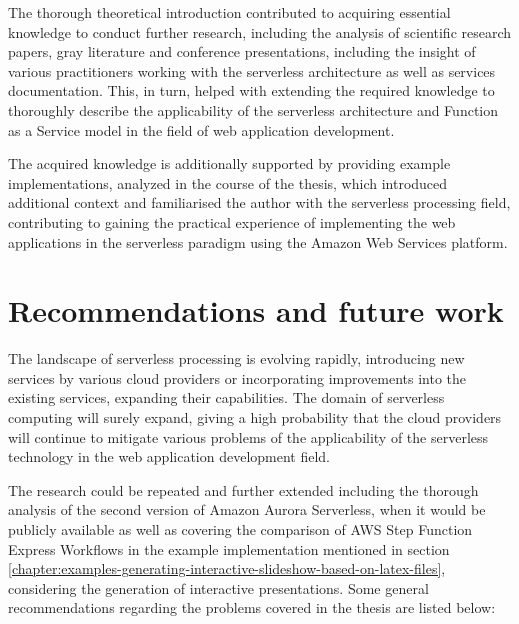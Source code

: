 The thorough theoretical introduction contributed to acquiring essential knowledge to conduct further research, including the analysis of scientific research papers, gray literature and conference presentations, including the insight of various practitioners working with the serverless architecture as well as services documentation.
This, in turn, helped with extending the required knowledge to thoroughly describe the applicability of the serverless architecture and Function as a Service model in the field of web application development.

The acquired knowledge is additionally supported by providing example implementations, analyzed in the course of the thesis, which introduced additional context and familiarised the author with the serverless processing field, contributing to gaining the practical experience of implementing the web applications in the serverless paradigm using the Amazon Web Services platform.

\section{Recommendations and future work}

The landscape of serverless processing is evolving rapidly, introducing new services by various cloud providers or incorporating improvements into the existing services, expanding their capabilities.
The domain of serverless computing will surely expand, giving a high probability that the cloud providers will continue to mitigate various problems of the applicability of the serverless technology in the web application development field.

The research could be repeated and further extended including the thorough analysis of the second version of Amazon Aurora Serverless, when it would be publicly available as well as covering the comparison of AWS Step Function Express Workflows in the example implementation mentioned in section \ref{chapter:examples-generating-interactive-slideshow-based-on-latex-files}, considering the generation of interactive presentations.
Some general recommendations regarding the problems covered in the thesis are listed below:

